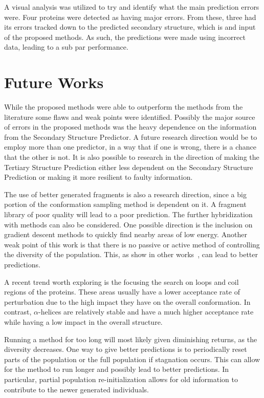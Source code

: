 A visual analysis was utilized to try and identify what the main prediction
errors were. Four proteins were detected as having major errors. From these,
three had its errors tracked down to the predicted secondary structure, which is
and input of the proposed methods. As such, the predictions were made using
incorrect data, leading to a sub par performance.

\section{Future Works}\label{sec:future_works}

While the proposed methods were able to outperform the methods from the
literature some flaws and weak points were identified. Possibly the major
source of errors in the proposed methods was the heavy dependence on the
information from the Secondary Structure Predictor. A future research direction
would be to employ more than one predictor, in a way that if one is wrong,
there is a chance that the other is not. It is also possible to research in the
direction of making the Tertiary Structure Prediction either less dependent on
the Secondary Structure Prediction or making it more resilient to faulty
information.

The use of better generated fragments is also a research direction, since a big
portion of the conformation sampling method is dependent on it. A fragment
library of poor quality will lead to a poor prediction.
The further hybridization with methods can also be considered.  One possible
direction is the inclusion on gradient descent methods to quickly find nearby
areas of low energy.
Another weak point of this work is that there is no passive or active method of
controlling the diversity of the population. This, as show in other
works~\cite{narloch2016diversification,simoncini2017balancing}, can lead to
better predictions.

A recent trend worth exploring is the focusing the search on loops and coil
regions of the proteins. These areas usually have a lower acceptance rate of
perturbation due to the high impact they have on the overall conformation.  In
contrast, $\alpha$-helices are relatively stable and have a much higher
acceptance rate while having a low impact in the overall structure.

Running a method for too long will most likely given diminishing returns, as
the diversity decreases. One way to give better predictions is to periodically
reset parts of the population or the full population if stagnation occurs. This
can allow for the method to run longer and possibly lead to better predictions.
In particular, partial population re-initialization allows for old information
to contribute to the newer generated individuals.

